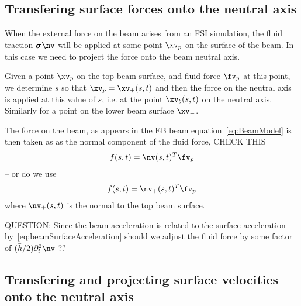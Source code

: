 \documentclass[11pt]{article}
\newcommand{\hs}{\bar{h}}
\newcommand{\xbv}{\xv_b}
\newcommand{\sigmav}{\boldsymbol{\sigma}}
\begin{document}
\subsection{Transfering surface forces onto the neutral axis} \label{sec:projectForces}

    When the external force on the beam arises from an FSI simulation, the fluid traction $\sigmav\nv$ will be applied
at some point $\xv_p$ on the surface of the beam. In this case we need to project the force onto the beam neutral axis. 

Given a point $\xv_p$ on the top beam surface, 
and fluid force $\fv_p$ at this point, we determine $s$ so that $\xv_p = \xv_+(s,t)$ and then
the force on the neutral axis is applied at this value of $s$, i.e. at the point $\xbv(s,t)$ on the neutral axis.
Similarly for a point on the lower beam surface $\xv_-$. 

The force on the beam, as appears in the EB beam equation~\eqref{eq:BeamModel} is then taken as as the normal component of the fluid force, 
CHECK THIS
\begin{align*}
    f(s,t) = \nv(s,t)^T\fv_p
\end{align*}
 -- or do we use
\begin{align*}
    f(s,t) = \nv_+(s,t)^T\fv_p
\end{align*}
where $\nv_+(s,t)$ is the normal to the top beam surface. 

QUESTION: Since the beam acceleration is related to the surface acceleration by~\eqref{eq:beamSurfaceAcceleration}
should we adjust the fluid force by some factor of $(\hs/2)\partial_t^2\nv$ ??

\subsection{Transfering and projecting surface velocities onto the neutral axis} \label{sec:projectVelocity}
\end{document}
